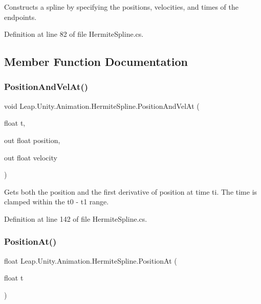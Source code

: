 Constructs a spline by specifying the positions, velocities, and times of the endpoints. 



Definition at line 82 of file Hermite\+Spline.\+cs.



\subsection{Member Function Documentation}
\mbox{\label{struct_leap_1_1_unity_1_1_animation_1_1_hermite_spline_af2db5d94c701fade7bfa01d5b55f97ea}} 
\subsubsection{\texorpdfstring{PositionAndVelAt()}{PositionAndVelAt()}}
{\footnotesize\ttfamily void Leap.\+Unity.\+Animation.\+Hermite\+Spline.\+Position\+And\+Vel\+At (\begin{DoxyParamCaption}\item[{float}]{t,  }\item[{out float}]{position,  }\item[{out float}]{velocity }\end{DoxyParamCaption})}



Gets both the position and the first derivative of position at time ti. The time is clamped within the t0 -\/ t1 range. 



Definition at line 142 of file Hermite\+Spline.\+cs.

\mbox{\label{struct_leap_1_1_unity_1_1_animation_1_1_hermite_spline_ad4db7c2122beaff31e89eb7e2e0dde36}} 
\subsubsection{\texorpdfstring{PositionAt()}{PositionAt()}}
{\footnotesize\ttfamily float Leap.\+Unity.\+Animation.\+Hermite\+Spline.\+Position\+At (\begin{DoxyParamCaption}\item[{float}]{t }\end{DoxyParamCaption})}



